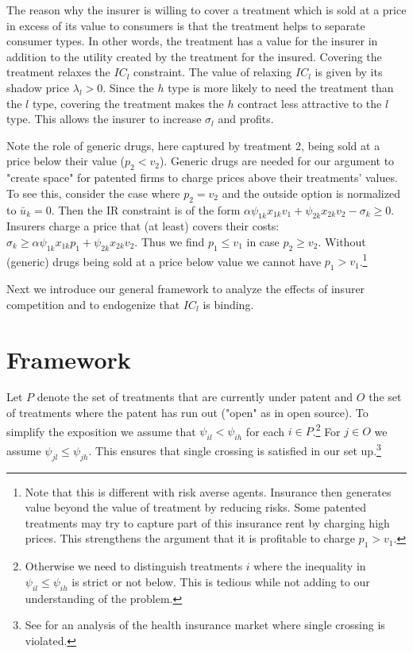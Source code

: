 \documentclass[12pt,english,a4paper]{article}
\begin{document}
The reason why the insurer is willing to cover a treatment which is sold at a price in excess of its value to consumers is that the treatment helps to separate consumer types. In other words, the treatment has a value for the insurer in addition to the utility created by the treatment for the insured. Covering the treatment relaxes the \(IC_l\) constraint. The value of relaxing \(IC_l\) is given by its shadow price \(\lambda_l > 0\). Since the \(h\) type is more likely to need the treatment than the \(l\) type, covering the treatment makes the \(h\) contract less attractive to the \(l\) type. This allows the insurer to increase \(\sigma_l\) and profits.

Note the role of generic drugs, here captured by treatment 2, being sold at a price below their value (\(p_2 < v_2\)). Generic drugs are needed for our argument to "create space" for patented firms to charge prices above their treatments' values. To see this, consider the case where \(p_2=v_2\) and the outside option is normalized to \(\bar u_k = 0\). Then the IR constraint is of the form \(\alpha \psi_{1k} x_{1k} v_1 + \psi_{2k}x_{2k}v_2 - \sigma_k \geq 0\). Insurers charge a price that (at least) covers their costs: \(\sigma_k \geq \alpha \psi_{1k} x_{1k} p_1 + \psi_{2k} x_{2k} v_2\). Thus we find \(p_1 \leq v_1\) in case \(p_2 \geq v_2\). Without (generic) drugs being sold at a price below value we cannot have \(p_1 > v_1\).\footnote{Note that this is different with risk averse agents. Insurance then generates value beyond the value of treatment by reducing risks. Some patented treatments may try to capture part of this insurance rent by charging high prices. This strengthens the argument that it is profitable to charge \(p_1>v_1\).}

Next we introduce our general framework to analyze the effects of insurer competition and to endogenize that \(IC_l\) is binding.

\section{Framework}
\label{sec:org9bb7ee4}

Let \(P\) denote the set of treatments that are currently under patent and \(O\) the set of treatments where the patent has run out ("open" as in open source). To simplify the exposition we assume that \(\psi_{il}<\psi_{ih}\) for each \(i \in P\).\footnote{Otherwise we need to distinguish treatments \(i\) where the inequality in \(\psi_{il} \leq \psi_{ih}\) is strict or not below. This is tedious while not adding to our understanding of the problem.} For \(j \in O\) we assume \(\psi_{jl} \leq \psi_{jh}\). This ensures that single crossing is satisfied in our set up.\footnote{See \cite{BooneS13} for an analysis of the health insurance market where single crossing is violated.}
\end{document}
